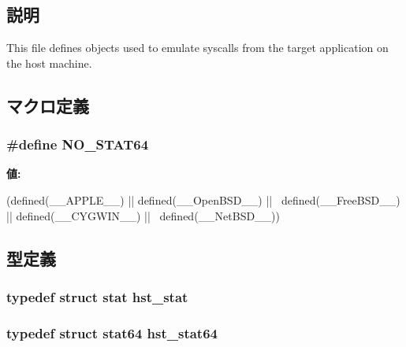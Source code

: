 \subsection{説明}
This file defines objects used to emulate syscalls from the target application on the host machine. 

\subsection{マクロ定義}
\hypertarget{syscall__emul_8hh_a1b37791ed9ed61caf1eafd4c2853c883}{
\subsubsection[{NO\_\-STAT64}]{\setlength{\rightskip}{0pt plus 5cm}\#define NO\_\-STAT64}}
\label{syscall__emul_8hh_a1b37791ed9ed61caf1eafd4c2853c883}
{\bfseries 値:}
\begin{DoxyCode}
(defined(__APPLE__) || defined(__OpenBSD__) || \
  defined(__FreeBSD__) || defined(__CYGWIN__) || \
  defined(__NetBSD__))
\end{DoxyCode}


\subsection{型定義}
\hypertarget{syscall__emul_8hh_a4385fa83cd626df796c087776dd3eaa7}{
\subsubsection[{hst\_\-stat}]{\setlength{\rightskip}{0pt plus 5cm}typedef struct stat {\bf hst\_\-stat}}}
\label{syscall__emul_8hh_a4385fa83cd626df796c087776dd3eaa7}
\hypertarget{syscall__emul_8hh_aa03f86fa4319b8ebc18a00641cf30543}{
\subsubsection[{hst\_\-stat64}]{\setlength{\rightskip}{0pt plus 5cm}typedef struct stat64 {\bf hst\_\-stat64}}}
\label{syscall__emul_8hh_aa03f86fa4319b8ebc18a00641cf30543}


